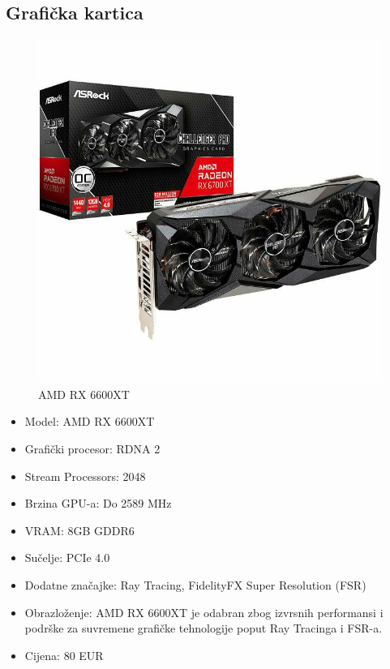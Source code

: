 \documentclass{article}
\begin{document}
\subsection{Grafička kartica}
\begin{figure}[H]
    \centering
    \includegraphics[scale=0.1]{Slike/graficka.jpg}
    \caption{AMD RX 6600XT}
    \label{fig:Grafička kartica}
\end{figure}
\begin{itemize}
    \item Model: AMD RX 6600XT
    \item Grafički procesor: RDNA 2
    \item Stream Processors: 2048
    \item Brzina GPU-a: Do 2589 MHz
    \item VRAM: 8GB GDDR6
    \item Sučelje: PCIe 4.0
    \item Dodatne značajke: Ray Tracing, FidelityFX Super Resolution (FSR)
    \item Obrazloženje: AMD RX 6600XT je odabran zbog izvrsnih performansi i podrške za suvremene grafičke tehnologije poput Ray Tracinga i FSR-a.
    \item Cijena: 80 EUR 
\end{itemize}
\pagebreak
\end{document}
